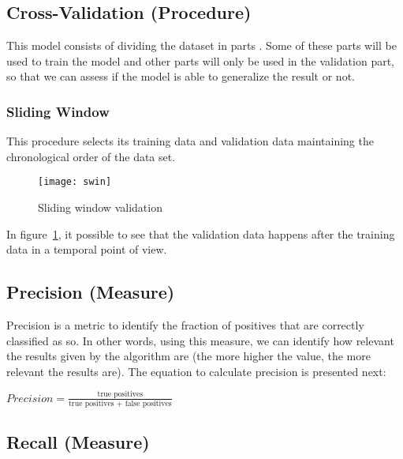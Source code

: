 \subsection{Cross-Validation (Procedure)}

This model consists of dividing the dataset in parts \cite{Witten:2005:DMP:1205860}
. Some of these parts will be used to train the model and other parts will only
be used in the validation part, so that we can assess if the model is able to
generalize the result or not. 

\subsubsection{Sliding Window}

This procedure selects its training data and validation data maintaining the
chronological order of the data set\cite{Bensch_self-learningprediction}.

\begin{figure}[!h]
  \begin{center}
    \leavevmode
    \texttt{[image: swin]}
    \caption{Sliding window validation}\cite{Bensch_self-learningprediction}
    \label{fig:swin}
  \end{center}
\end{figure}
\FloatBarrier

In figure~\ref{fig:swin}, it possible to see that the validation data happens
after the training data in a temporal point of view.


\subsection{Precision (Measure)}

Precision is a metric to identify the fraction of positives that are correctly
classified as so. In other words, using this measure, we can identify how relevant the
results given by the algorithm are (the more higher the value, the more relevant
the results are). The equation to calculate precision is presented next:

\begin{center}
\Large
\begin{math}
Precision = \frac{\text{true positives}}{\text{true positives + false positives}}
\end{math}
\normalsize
\end{center}


\subsection{Recall (Measure)}

